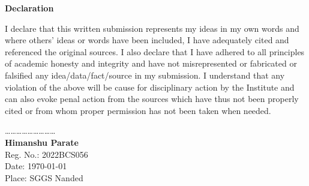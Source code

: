 \documentclass[12pt, a4paper, twoside, openright]{Thesis} %
\begin{document}
{{\vspace{0.6cm}


\vfill{}}


\clearpage %





{ %

\centerline{\textbf{\LARGE {Declaration}}}}
\vspace{3em}
I declare that this written submission represents my ideas in my own words and where others' ideas or words have been included, I have adequately cited and referenced the original sources. I also declare that I have adhered to all principles of academic honesty and integrity and have not misrepresented or fabricated or falsified any idea/data/fact/source in my submission. I understand that any violation of the above will be cause for disciplinary action by the Institute and can also evoke penal action from the sources which have thus not been properly cited or from whom proper permission has not been taken when needed.

\bigskip
\bigskip
\bigskip
\bigskip

\begin{flushleft}
\ldots \ldots \ldots \ldots \ldots \ldots \ldots \ldots \ldots\\
\vspace{2mm}
\textbf{Himanshu Parate} \\
Reg. No.: 2022BCS056 \\
Date: \today  \\
Place: SGGS Nanded
\end{flushleft}

\clearpage %







}
\end{document}
